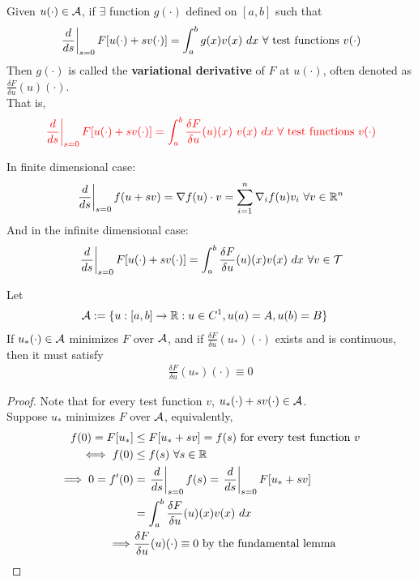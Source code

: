 \documentclass{article}
\begin{document}
	\begin{definition}
		Given $u(\cdot) \in \mathcal{{A}}$, if $\exists$ function $g(\cdot)$ defined on $[a, b]$ such that 
		\begin{align}
			\left. \frac{d}{ds} \right |_{s=0} F[u(\cdot) + sv(\cdot)] = \int_a^b g(x) v(x)\ dx\ \forall \text{{ test functions }} v(\cdot)
		\end{align}
		Then $g(\cdot)$ is called the \textbf{variational derivative} of $F$ at $u(\cdot)$, often denoted as $\frac{\delta F}{\delta u}(u)(\cdot)$. \\
		That is,
		\begin{align}
			\textcolor{red}{\left. \frac{d}{ds} \right |_{s=0} F[u(\cdot) + sv(\cdot)] = \int_a^b \frac{\delta F}{\delta u}(u)(x)\ v(x)\ dx\ \forall \text{{ test functions }} v(\cdot)}
		\end{align}
	\end{definition}
	
	\begin{remark}
		In finite dimensional case:
		\begin{align}
			\left. \frac{d}{ds} \right |_{s=0} f(u + sv) = \nabla f(u) \cdot v = \sum_{i=1}^n \nabla_i f(u) v_i\ \forall v \in \mathbb{R}^n
		\end{align}
		And in the infinite dimensional case:
		\begin{align}
			\left. \frac{d}{ds} \right |_{s=0} F[u(\cdot) + s v(\cdot)] = \int_a^b \frac{\delta F}{\delta u}(u)(x) v(x)\ dx\ \forall v \in \mathcal{{T}}
		\end{align}
	\end{remark}
	
	\begin{lemma}
		Let 
		\begin{align}
			\mathcal{{A}} &:=\{u:[a, b] \to \mathbb{R}:u \in C^1, u(a) = A, u(b) = B\}
		\end{align}
		If $u_*(\cdot) \in \mathcal{{A}}$ minimizes $F$ over $\mathcal{{A}}$, and if $\frac{\delta F}{\delta u}(u_*)(\cdot)$ exists and is continuous, then it must satisfy
		\begin{align}
			\frac{\delta F}{\delta u}(u_*)(\cdot) \equiv 0
		\end{align}
	\end{lemma}
	
	\begin{proof}
		Note that for every test function $v$, $u_*(\cdot) + s v(\cdot) \in \mathcal{{A}}$. \\
		Suppose $u_*$ minimizes $F$ over $\mathcal{{A}}$, equivalently,
		\begin{align}
			f(0) = F[u_*] &\leq F[u_* + sv] = f(s) \text{{ for every test function $v$}} \\
			\iff f(0) &\leq f(s)\ \forall s \in \mathbb{R} \\
			\implies 0 = f'(0) 
			&= \left. \frac{d}{ds} \right |_{s=0} f(s)
			= \left. \frac{d}{ds} \right |_{s=0} F[u_* + sv] \\
			&= \int_a^b \frac{\delta F}{\delta u}(u)(x)v(x)\ dx \\
			\implies &\frac{\delta F}{\delta u}(u)(\cdot) \equiv 0 \text{{ by the fundamental lemma}}
		\end{align}
	\end{proof}
	
\end{document}
